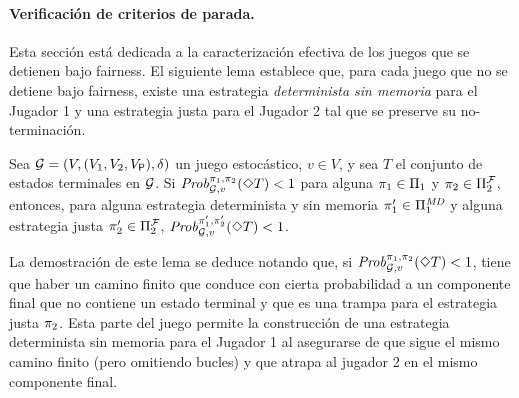 \paragraph{Verificación de criterios de parada.}

Esta sección está dedicada a la
caracterización efectiva de los juegos que se detienen bajo fairness.
El
siguiente lema establece que, para cada juego que no se detiene bajo
fairness, existe una estrategia \emph{determinista sin memoria} para el
Jugador 1 y una estrategia justa para el Jugador 2 tal que se preserve su no-terminación.


\begin{lemma}\label{lemma:memoryless-strat}
  Sea $\mathcal{G} = (V, (V_1, V_2, V_{\mathsf{P}}), \delta)$ un juego estocástico, $v \in V$, y sea $T$ el conjunto de estados terminales en $\mathcal{G}$.
  Si $\mathit{Prob}^{\pi_{1}, \pi_{2}}_{\mathcal{G}, v}(\Diamond T) < 1$
  para alguna
  $\pi_{1} \in \Pi_{1}$ y $\pi_{2} \in \Pi^{\mathcal{F}}_{2}$,
  entonces, para alguna estrategia determinista y sin memoria
  $\pi_{1}' \in \Pi^{\textit{MD}}_{1}$ y alguna estrategia justa
  $\pi_{2}' \in \Pi^{\mathcal{F}}_{2}$,
  $\mathit{Prob}^{\pi_{1}', \pi_{2}'}_{\mathcal{G}, v}(\Diamond T) < 1$.
\end{lemma}

La demostración de este lema se deduce notando que, si
$\mathit{Prob}^{\pi_{1}, \pi_{2}}_{\mathcal{G}, v}(\Diamond T) < 1$, tiene que haber
un camino finito que conduce con cierta probabilidad a un componente final
que no contiene un estado terminal y que es una trampa para el
estrategia justa $\pi_{2}$. Esta parte del juego permite la
construcción de una estrategia determinista sin memoria para el Jugador 1 al
asegurarse de que sigue el mismo camino finito (pero omitiendo bucles) y
que atrapa al jugador 2 en el mismo componente final.

